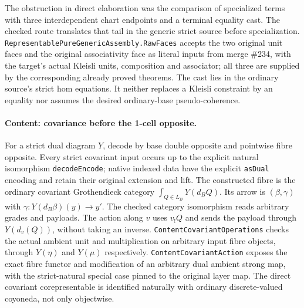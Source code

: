 \documentclass[11pt]{article}
\newcommand{\m}[1]{\texttt{#1}}
\begin{document}
The obstruction in direct elaboration was the comparison of specialized
terms with three interdependent chart endpoints and a terminal equality cast.
The checked route translates that tail in the generic strict source before
specialization. \m{RepresentablePureGenericAssembly.RawFaces} accepts the
two original unit faces and the original associativity face as literal inputs
from merge \#234, with the target's actual Kleisli units, composition and
associator; all three are supplied by the corresponding already proved
theorems. The cast lies in the ordinary source's strict hom equations.
It neither replaces a Kleisli constraint by an equality nor assumes the
desired ordinary-base pseudo-coherence.

\paragraph{Content: covariance before the 1-cell opposite.}
For a strict dual diagram $Y$, decode by base double opposite and pointwise
fibre opposite. Every strict covariant input occurs up to the explicit
natural isomorphism \m{decodeEncode}; native indexed data have the explicit
\m{asDual} encoding and retain their original extension and lift.
The constructed fibre is the ordinary covariant Grothendieck category
$\int_{Q\in L_B}Y(d_BQ)$. Its arrow is $(\beta,\gamma)$ with
$\gamma:Y(d_B\beta)(y)\to y'$. The checked category isomorphism reads
arbitrary grades and payloads. The action along $v$ uses $v_!Q$ and sends
the payload through $Y(d_v(Q))$, without taking an inverse.
\m{ContentCovariantOperations} checks the actual ambient unit and
multiplication on arbitrary input fibre objects, through $Y(\eta)$ and
$Y(\mu)$ respectively. \m{ContentCovariantAction} exposes the exact
fibre functor and modification of an arbitrary dual ambient strong map,
with the strict-natural special case pinned to the original layer map.
The direct covariant corepresentable is identified naturally with ordinary
discrete-valued coyoneda, not only objectwise.
\end{document}
